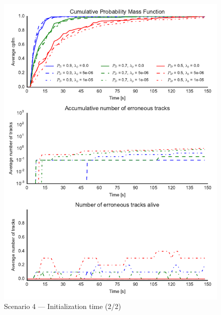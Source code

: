 \begin{figure}
\centering
\includegraphics{Figures/plots/Scenario4_Init-Time(2-2).pdf}
\caption{Scenario 4 --- Initialization time (2/2)}\label{fig:init4_time_2-2}
\end{figure}

